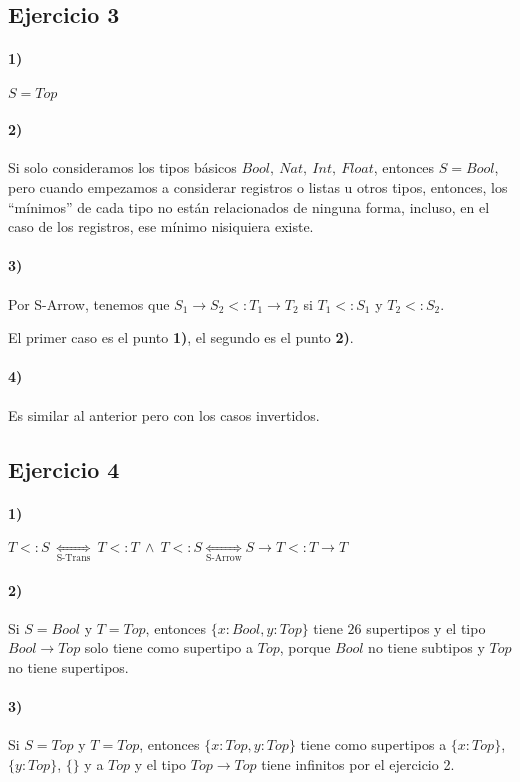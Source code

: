 \documentclass[10pt,a4paper,landscape]{article}
\begin{document}
\subsection{Ejercicio 3}
\paragraph{1)} $S = Top$
\paragraph{2)} Si solo consideramos los tipos básicos $Bool,~Nat,~Int,~Float$, entonces $S=Bool$, pero cuando empezamos a considerar registros o listas u otros tipos, entonces, los ``mínimos'' de cada tipo no están relacionados de ninguna forma, incluso, en el caso de los registros, ese mínimo nisiquiera existe.
\paragraph{3)} Por S-Arrow, tenemos que $S_1\to S_2 <: T_1\to T_2$ si $T_1 <: S_1$ y $T_2 <: S_2$. 

El primer caso es el punto \textbf{1)}, el segundo es el punto \textbf{2)}.
\paragraph{4)} Es similar al anterior pero con los casos invertidos.

\subsection{Ejercicio 4}
\paragraph{1)} $T<:S~\underset{\text{S-Trans}}{\iff} ~ T<:T~\land~T<:S \underset{\text{S-Arrow}}{\iff} S\to T <: T\to T$
\paragraph{2)} Si $S = Bool$ y $T = Top$, entonces $\{x:Bool, y:Top\}$ tiene $26$ supertipos y el tipo $Bool\to Top$ solo tiene como supertipo a $Top$, porque $Bool$ no tiene subtipos y $Top$ no tiene supertipos.
\paragraph{3)} Si $S = Top$ y $T = Top$, entonces $\{x:Top, y:Top\}$ tiene como supertipos a $\{x:Top\}$, $\{y:Top\}$, $\{\}$ y a $Top$ y el tipo $Top\to Top$ tiene infinitos por el ejercicio 2.
\end{document}
